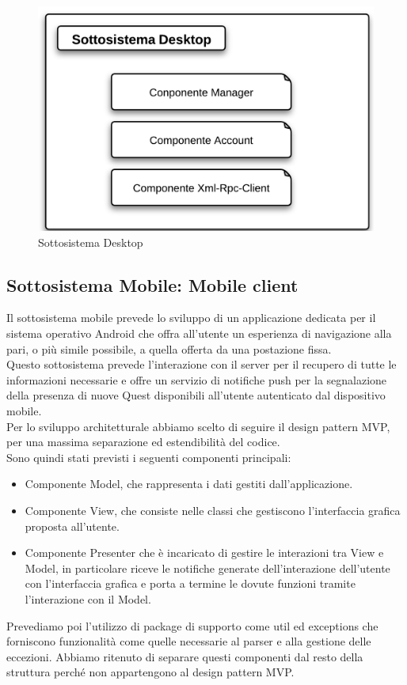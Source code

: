 {{%
\begin{figure}[H]
\centering
\includegraphics[scale=0.7]{images/cap2/Desktop/sottosistemaDesktop.png} %
\caption{Sottosistema Desktop}
\label{Sottosistema Desktop}
\end{figure}



\subsection{Sottosistema Mobile: Mobile client}
Il sottosistema mobile prevede lo sviluppo di un applicazione dedicata per il sistema operativo Android che offra all'utente un esperienza di navigazione alla pari, o più simile possibile, a quella offerta da una postazione fissa.\\
Questo sottosistema prevede l'interazione con il server per il recupero di tutte le informazioni necessarie e offre un servizio di notifiche push per la segnalazione della presenza di nuove Quest disponibili all'utente autenticato dal dispositivo mobile.\\
Per lo sviluppo architetturale abbiamo scelto di seguire il design pattern MVP, per una massima separazione ed estendibilità del codice.\\
Sono quindi stati previsti i seguenti componenti principali:
\begin{itemize}
\item Componente Model, che rappresenta i dati gestiti dall'applicazione.
\item Componente View, che consiste nelle classi che gestiscono l'interfaccia grafica proposta all'utente.
\item Componente Presenter che è incaricato di gestire le interazioni tra View e Model, in particolare riceve le notifiche generate dell'interazione dell'utente con l'interfaccia grafica e porta a termine le dovute funzioni tramite l'interazione con il Model.
\end{itemize}
Prevediamo poi l'utilizzo di package di supporto come util ed exceptions che forniscono funzionalità come quelle necessarie al parser e alla gestione delle eccezioni. Abbiamo ritenuto di separare questi componenti dal resto della struttura perché non appartengono al design pattern MVP.

}}
